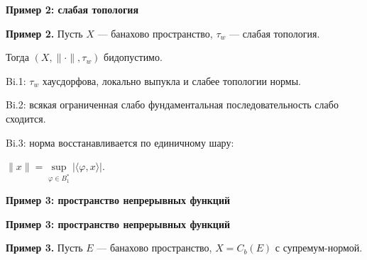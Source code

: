 \documentclass[11pt]{article}
\let\ph\varphi
\begin{document}
\newpage

\begin{center}
{\color{notaeYELLOW}\bfseries\fontsize{44}{52}\selectfont Пример 2: слабая топология}
\end{center}
\vspace*{\fill}
\begin{center}
\fontsize{36}{43}\selectfont
\parbox{\linewidth}{\centering\noindent \textbf{Пример 2.} Пусть $X$ --- банахово пространство, $\tau_w$ --- слабая топология.
\par}\vspace{0.4in}
\parbox{\linewidth}{\centering\noindent Тогда $(X,\|\cdot\|,\tau_w)$ бидопустимо.
\par}\vspace{0.4in}
\parbox{\linewidth}{\centering\noindent Bi.1: $\tau_w$ хаусдорфова, локально выпукла и слабее топологии нормы.
\par}\vspace{0.4in}
\parbox{\linewidth}{\centering\noindent Bi.2: всякая ограниченная слабо фундаментальная последовательность слабо сходится.
\par}\vspace{0.4in}
\parbox{\linewidth}{\centering\noindent Bi.3: норма восстанавливается по единичному шару:
\par}\vspace{0.4in}
\parbox{\linewidth}{\centering\noindent $\|x\|=\sup\limits_{\ph\in B_1^*}|\langle \ph, x \rangle|.$
\par}\vspace{0.4in}
\end{center}
\vspace*{\fill}

\newpage

\begin{center}
{\color{notaeYELLOW}\bfseries\fontsize{44}{52}\selectfont Пример 3: пространство непрерывных функций}
\end{center}
\vspace*{\fill}
\begin{center}
\fontsize{36}{43}\selectfont
\end{center}
\vspace*{\fill}

\newpage

\begin{center}
{\color{notaeYELLOW}\bfseries\fontsize{44}{52}\selectfont Пример 3: пространство непрерывных функций}
\end{center}
\vspace*{\fill}
\begin{center}
\fontsize{36}{43}\selectfont
\parbox{\linewidth}{\centering\noindent \textbf{Пример 3.} Пусть $E$ --- банахово пространство, $X=C_b(E)$ с супремум-нормой.
\par}\vspace{0.4in}
\end{center}
\vspace*{\fill}
\end{document}
